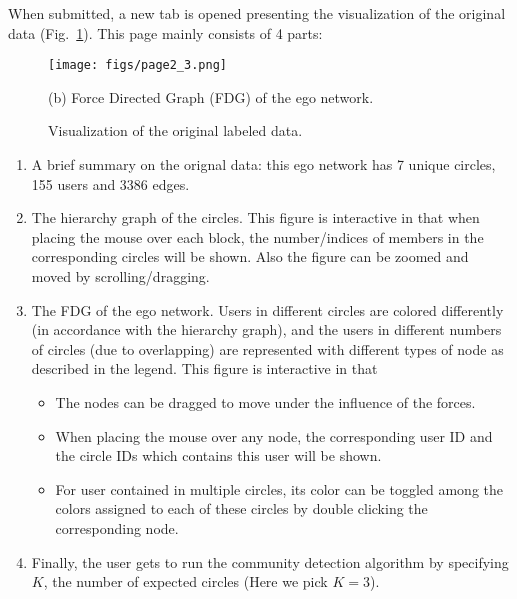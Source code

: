 When submitted, a new tab is opened presenting the visualization of the original
data (Fig.~\ref{fig:page2}). This page mainly consists of 4 parts:
\begin{figure}[!t]
    \noindent{}
    \begin{minipage}[b]{1\linewidth}
      \centering
      \centerline{\texttt{[image: figs/page2\_3.png]}}
      \centerline{(b) Force Directed Graph (FDG) of the ego network.}\medskip
    \end{minipage}
    \caption{Visualization of the original labeled data.}
    \label{fig:page2}
\end{figure}
\begin{enumerate}
    \item A brief summary on the orignal data: this ego network has 7 unique
    circles, 155 users and 3386 edges.
    \item The hierarchy graph of the circles. This figure is interactive in
    that when placing the mouse over each block, the number/indices of members
    in the corresponding circles will be shown. Also the figure can be zoomed
    and moved by scrolling/dragging.
    \item The FDG of the ego network. Users in different circles are colored
    differently (in accordance with the hierarchy graph), and the users in
    different numbers of circles (due to overlapping) are represented with
    different types of node as described in the legend. This figure is
    interactive in that 
    \begin{itemize}
        \item The nodes can be dragged to move under the influence of the
        forces.
        \item When placing the mouse over any node, the corresponding user ID
        and the circle IDs which contains this user will be shown.
        \item For user contained in multiple circles, its color can be
        toggled among the colors assigned to each of these circles by double
        clicking the corresponding node.
    \end{itemize}
    \item Finally, the user gets to run the community detection algorithm by
    specifying $K$, the number of expected circles (Here we pick $K=3$).
\end{enumerate}

